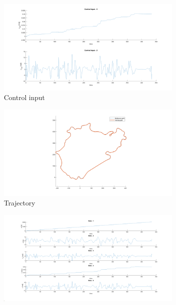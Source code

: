 \begin{figure}[H]
    \centering
     \begin{subfigure}[b]{0.45\textwidth}
         \centering
         \includegraphics[width=\textwidth]{Latex report/image/ex2/inputNewpole.png}
         \caption{Control input}
         \label{fig:NPinput}
     \end{subfigure}
     \begin{subfigure}[b]{0.45\textwidth}
         \centering
         \includegraphics[width=\textwidth]{Latex report/image/ex2/trajectoryNewpole.png}
         \caption{Trajectory}
         \label{fig:NPtraj}
     \end{subfigure}
     \begin{subfigure}[b]{0.8\textwidth}
         \centering
         \includegraphics[width=\textwidth]{Latex report/image/ex2/stateNewpole.png}

\end{subfigure}
\end{figure}
